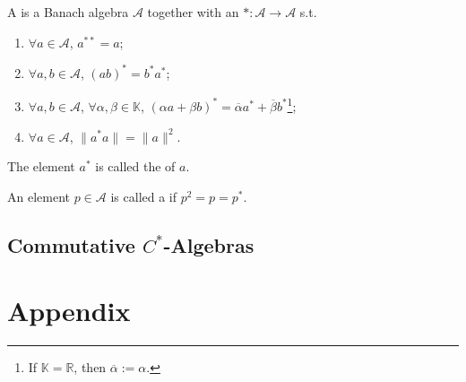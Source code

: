 \documentclass[openany, a5paper]{book}
\begin{document}
\begin{definition}[$C^*$-algebra]
    A  is a Banach algebra $\mathscr A$ together with an  $* \colon \mathscr A \to \mathscr A$ s.t.\ 
    \begin{enumerate}
        \item $\forall a \in \mathscr A$, $a^{**} = a$;
        \item $\forall a, b \in \mathscr A$, $(ab)^* = b^* a^*$;
        \item $\forall a, b \in \mathscr A$, $\forall \alpha, \beta \in \mathbb K$,
            $(\alpha a + \beta b)^* = \overline \alpha a^* + \overline \beta b^*$\footnote{%
                If $\mathbb K = \mathbb R$, then $\overline \alpha := \alpha$.
            };
        \item $\forall a \in \mathscr A$, $\|a^* a\| = \|a\|^2$.
    \end{enumerate}

    The element $a^*$ is called the  of $a$.
\end{definition}

\begin{definition}[Projection]
    An element $p \in \mathscr A$ is called a  if $p^2 = p = p^*$.
\end{definition}

\section{\texorpdfstring{Commutative $C^*$-Algebras}{Commutative C*-Algebras}}

\appendix
\renewcommand{\theequation}{\Alph{chapter}-\arabic{equation}}
\chapter{Appendix}

\backmatter
\nocite{*} %
\printbibliography[heading=bibliography, title={Bibliography}]

\printindex[symbol]

\printindex
\end{document}
